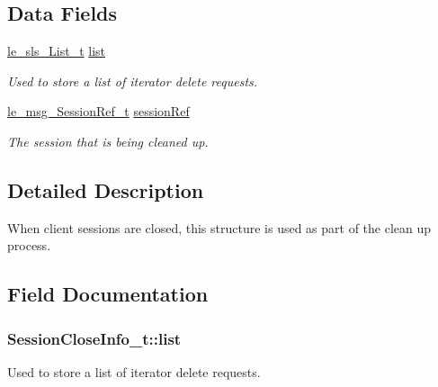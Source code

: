 \subsection*{Data Fields}
\begin{DoxyCompactItemize}
\item 
\hyperlink{structle__sls___list__t}{le\+\_\+sls\+\_\+\+List\+\_\+t} \hyperlink{struct_session_close_info__t_ad68d1e747e80c0d43ab7bbe9f448313d}{list}
\begin{DoxyCompactList}\small\item\em Used to store a list of iterator delete requests. \end{DoxyCompactList}\item 
\hyperlink{le__messaging_8h_aebfc01e15b430a5b4f3038a5bd518904}{le\+\_\+msg\+\_\+\+Session\+Ref\+\_\+t} \hyperlink{struct_session_close_info__t_abc1fcb8d925780289890fc7ae2de7f17}{session\+Ref}
\begin{DoxyCompactList}\small\item\em The session that is being cleaned up. \end{DoxyCompactList}\end{DoxyCompactItemize}


\subsection{Detailed Description}
When client sessions are closed, this structure is used as part of the clean up process. 

\subsection{Field Documentation}
\subsubsection[{\texorpdfstring{list}{list}}]{ Session\+Close\+Info\+\_\+t\+::list}\hypertarget{struct_session_close_info__t_ad68d1e747e80c0d43ab7bbe9f448313d}{}\label{struct_session_close_info__t_ad68d1e747e80c0d43ab7bbe9f448313d}


Used to store a list of iterator delete requests. 

